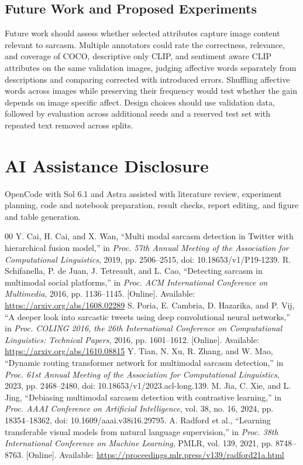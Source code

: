 \documentclass[conference]{IEEEtran}
\begin{document}
\subsection{Future Work and Proposed Experiments}
Future work should assess whether selected attributes capture image content relevant to sarcasm. Multiple annotators could rate the correctness, relevance, and coverage of COCO, descriptive only CLIP, and sentiment aware CLIP attributes on the same validation images, judging affective words separately from descriptions and comparing corrected with introduced errors. Shuffling affective words across images while preserving their frequency would test whether the gain depends on image specific affect. Design choices should use validation data, followed by evaluation across additional seeds and a reserved test set with repeated text removed across splits.

\section*{AI Assistance Disclosure}
OpenCode with Sol 6.1 and Astra assisted with literature review, experiment planning, code and notebook preparation, result checks, report editing, and figure and table generation. 

\balance
\begin{thebibliography}{00}
 Y. Cai, H. Cai, and X. Wan, ``Multi modal sarcasm detection in Twitter with hierarchical fusion model,'' in \emph{Proc. 57th Annual Meeting of the Association for Computational Linguistics}, 2019, pp. 2506--2515, doi: 10.18653/v1/P19-1239.
 R. Schifanella, P. de Juan, J. Tetreault, and L. Cao, ``Detecting sarcasm in multimodal social platforms,'' in \emph{Proc. ACM International Conference on Multimedia}, 2016, pp. 1136--1145. [Online]. Available: \url{https://arxiv.org/abs/1608.02289}
 S. Poria, E. Cambria, D. Hazarika, and P. Vij, ``A deeper look into sarcastic tweets using deep convolutional neural networks,'' in \emph{Proc. COLING 2016, the 26th International Conference on Computational Linguistics: Technical Papers}, 2016, pp. 1601--1612. [Online]. Available: \url{https://arxiv.org/abs/1610.08815}
 Y. Tian, N. Xu, R. Zhang, and W. Mao, ``Dynamic routing transformer network for multimodal sarcasm detection,'' in \emph{Proc. 61st Annual Meeting of the Association for Computational Linguistics}, 2023, pp. 2468--2480, doi: 10.18653/v1/2023.acl-long.139.
 M. Jia, C. Xie, and L. Jing, ``Debiasing multimodal sarcasm detection with contrastive learning,'' in \emph{Proc. AAAI Conference on Artificial Intelligence}, vol. 38, no. 16, 2024, pp. 18354--18362, doi: 10.1609/aaai.v38i16.29795.
 A. Radford et al., ``Learning transferable visual models from natural language supervision,'' in \emph{Proc. 38th International Conference on Machine Learning}, PMLR, vol. 139, 2021, pp. 8748--8763. [Online]. Available: \url{https://proceedings.mlr.press/v139/radford21a.html}
\end{thebibliography}
\end{document}

